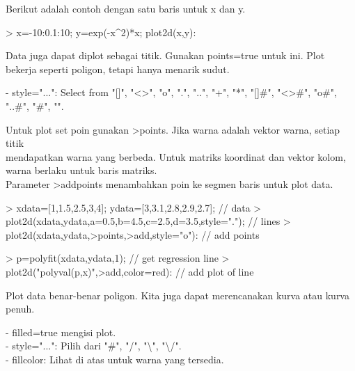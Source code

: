 \documentclass[a4paper,10pt]{article}
\begin{document}
\begin{eulernotebook}
\begin{eulercomment}
\begin{eulercomment}
\begin{eulercomment}
\begin{eulercomment}
\begin{eulercomment}
\begin{eulercomment}
\begin{eulercomment}
Berikut adalah contoh dengan satu baris untuk x dan y.
\end{eulercomment}
\begin{eulerprompt}
> x=-10:0.1:10; y=exp(-x^2)*x; plot2d(x,y):
\end{eulerprompt}
\begin{eulercomment}
Data juga dapat diplot sebagai titik. Gunakan points=true untuk ini.
Plot bekerja seperti poligon, tetapi hanya menarik sudut.

- style="...": Select from "[]", "\textless{}\textgreater{}", "o", ".", "..", "+", "*",
"[]#", "\textless{}\textgreater{}#", "o#", "..#", "#", "\textbar{}".

Untuk plot set poin gunakan \textgreater{}points. Jika warna adalah vektor warna,
setiap titik\\
mendapatkan warna yang berbeda. Untuk matriks koordinat dan vektor
kolom, warna berlaku untuk baris matriks.\\
Parameter \textgreater{}addpoints menambahkan poin ke segmen baris untuk plot data.
\end{eulercomment}
\begin{eulerprompt}
> xdata=[1,1.5,2.5,3,4]; ydata=[3,3.1,2.8,2.9,2.7]; // data
> plot2d(xdata,ydata,a=0.5,b=4.5,c=2.5,d=3.5,style="."); // lines
> plot2d(xdata,ydata,>points,>add,style="o"): // add points
\end{eulerprompt}
\begin{eulerprompt}
> p=polyfit(xdata,ydata,1); // get regression line
> plot2d("polyval(p,x)",>add,color=red): // add plot of line
\end{eulerprompt}
\begin{eulercomment}
Plot data benar-benar poligon. Kita juga dapat merencanakan kurva atau
kurva penuh.

- filled=true mengisi plot.\\
- style="...": Pilih dari "#", "/", "\textbackslash{}", "\textbackslash{}/".\\
- fillcolor: Lihat di atas untuk warna yang tersedia.


\end{eulercomment}
\end{eulercomment}
\end{eulercomment}
\end{eulercomment}
\end{eulercomment}
\end{eulercomment}
\end{eulercomment}
\end{eulernotebook}
\end{document}

